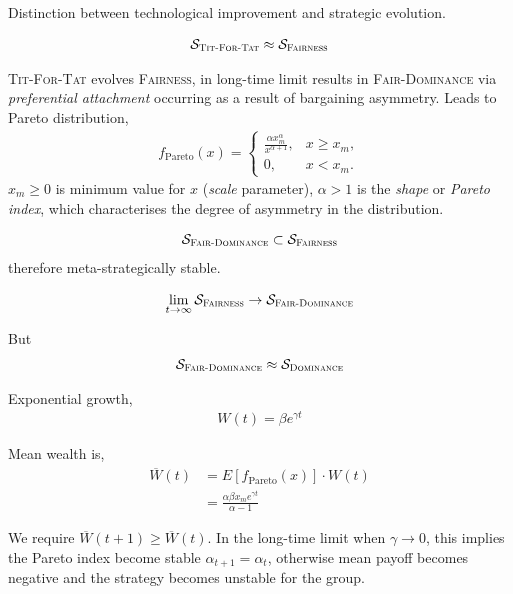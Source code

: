 \documentclass[twocolumn, aps, rmp, amsmath, amssymb, nofootinbib, superscriptaddress, longbibliography, floatfix, table-of-contents, eqsecnum]{revtex4-1}
\begin{document}
Distinction between technological improvement and strategic evolution.

\begin{align}
\mathcal{S}_\textsc{Tit-For-Tat} \approx \mathcal{S}_\textsc{Fairness}	
\end{align}

\textsc{Tit-For-Tat} evolves \textsc{Fairness}, in long-time limit results in \textsc{Fair-Dominance} via \textit{preferential attachment} occurring as a result of bargaining asymmetry. Leads to Pareto distribution,
\begin{align}
f_\text{Pareto}(x) = \left\{\begin{array}{ll}
\frac{\alpha x_m^\alpha}{x^{\alpha+1}}, & x\geq x_m,\\
0, & x<x_m.
\end{array}\right.
\end{align}
$x_m\geq 0$ is minimum value for $x$ (\textit{scale} parameter), $\alpha>1$ is the \textit{shape} or \textit{Pareto index}, which characterises the degree of asymmetry in the distribution.

\begin{align}
	\mathcal{S}_\textsc{Fair-Dominance} \subset \mathcal{S}_\textsc{Fairness}
\end{align}
therefore meta-strategically stable.

\begin{align}
	\lim_{t\to\infty} \mathcal{S}_\textsc{Fairness} \to \mathcal{S}_\textsc{Fair-Dominance}
\end{align}

But
\begin{align}
	\mathcal{S}_\textsc{Fair-Dominance} \approx \mathcal{S}_\textsc{Dominance}
\end{align}

Exponential growth,
\begin{align}
W(t) = \beta e^{\gamma t}	
\end{align}

Mean wealth is,
\begin{align}
	{\overline W}(t) &= E[f_\text{Pareto}(x)] \cdot W(t) \nonumber\\
	&= \frac{\alpha \beta x_m e^{\gamma t}}{\alpha - 1}
\end{align}

We require ${\overline W}(t+1)\geq {\overline W}(t)$. In the long-time limit when $\gamma\to 0$, this implies the Pareto index become stable $\alpha_{t+1} = \alpha_t$, otherwise mean payoff becomes negative and the strategy becomes unstable for the group.
\end{document}
